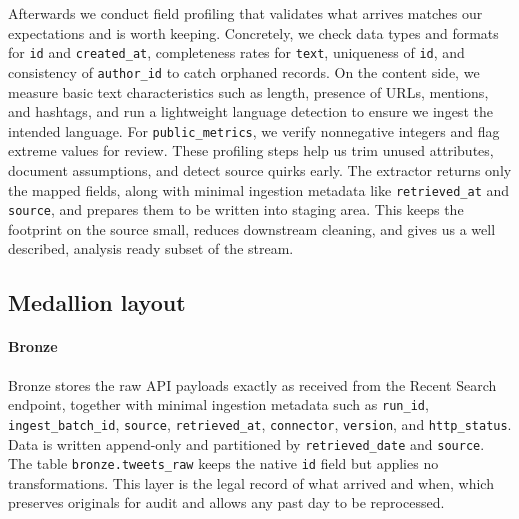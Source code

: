 Afterwards  we conduct field profiling that validates what arrives matches our expectations and is worth keeping. Concretely, we check data types and formats for \texttt{id} and \texttt{created\_at}, completeness rates for \texttt{text}, uniqueness of \texttt{id}, and consistency of \texttt{author\_id} to catch orphaned records. On the content side, we measure basic text characteristics such as length, presence of URLs, mentions, and hashtags, and run a lightweight language detection to ensure we ingest the intended language. For \texttt{public\_metrics}, we verify nonnegative integers and flag extreme values for review. These profiling steps help us trim unused attributes, document assumptions, and detect source quirks early. The extractor returns only the mapped fields, along with minimal ingestion metadata like \texttt{retrieved\_at} and \texttt{source}, and prepares them to be written into staging area. This keeps the footprint on the source small, reduces downstream cleaning, and gives us a well described, analysis ready subset of the stream.

\FloatBarrier

\subsection{Medallion layout}

\paragraph{Bronze}
Bronze stores the raw API payloads exactly as received from the Recent Search endpoint, together with minimal ingestion metadata such as \texttt{run\_id}, \texttt{ingest\_batch\_id}, \texttt{source}, \texttt{retrieved\_at}, \texttt{connector}, \texttt{version}, and \texttt{http\_status}. Data is written append-only and partitioned by \texttt{retrieved\_date} and \texttt{source}. The table \texttt{bronze.tweets\_raw} keeps the native \texttt{id} field but applies no transformations. This layer is the legal record of what arrived and when, which preserves originals for audit and allows any past day to be reprocessed.

